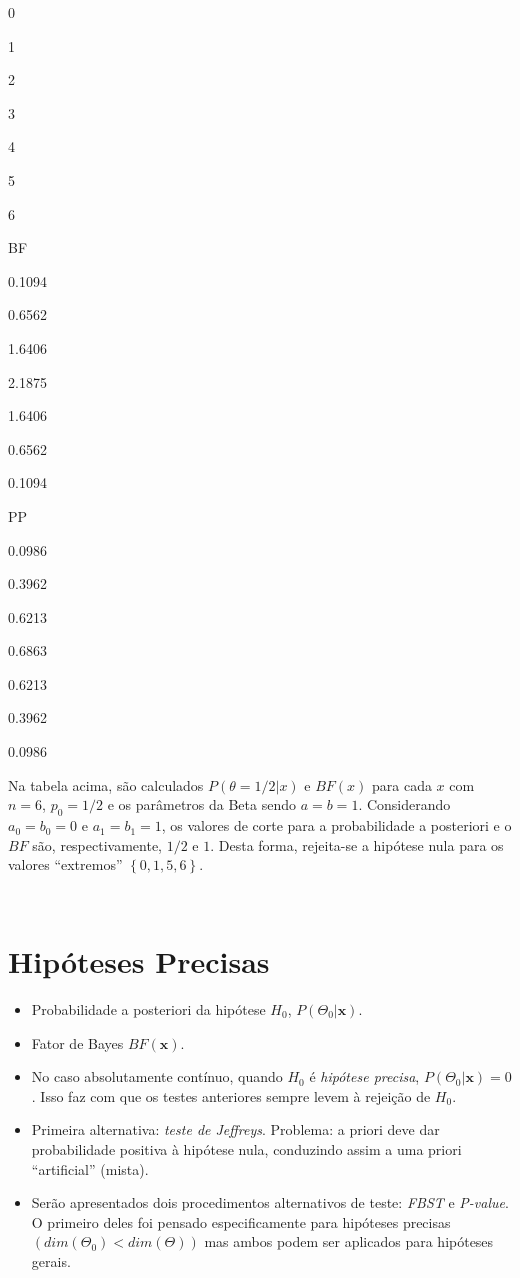 \documentclass[
]{book}
\begin{document}
0

1

2

3

4

5

6

BF

0.1094

0.6562

1.6406

2.1875

1.6406

0.6562

0.1094

PP

0.0986

0.3962

0.6213

0.6863

0.6213

0.3962

0.0986

Na tabela acima, são calculados \(P(\theta=1/2|x)\) e \(BF(x)\) para cada \(x\) com \(n=6\), \(p_0=1/2\) e os parâmetros da Beta sendo \(a=b=1\). Considerando \(a_0=b_0=0\) e \(a_1=b_1=1\), os valores de corte para a probabilidade a posteriori e o \(BF\) são, respectivamente, \(1/2\) e \(1\). Desta forma, rejeita-se a hipótese nula para os valores ``extremos'' \(\left\{0,1,5,6\right\}\).

\(~\)

\(~\)

\hypertarget{hipuxf3teses-precisas}{%
\section{Hipóteses Precisas}\label{hipuxf3teses-precisas}}

\begin{itemize}
\item
  Probabilidade a posteriori da hipótese \(H_0\), \(P(\Theta_0|\boldsymbol x)\).
\item
  Fator de Bayes \(BF(\boldsymbol x)\).
\item
  No caso absolutamente contínuo, quando \(H_0\) é \emph{hipótese precisa}, \(P(\Theta_0|\boldsymbol x)=0\). Isso faz com que os testes anteriores sempre levem à rejeição de \(H_0\).
\item
  Primeira alternativa: \emph{teste de Jeffreys}. Problema: a priori deve dar probabilidade positiva à hipótese nula, conduzindo assim a uma priori ``artificial'' (mista).
\item
  Serão apresentados dois procedimentos alternativos de teste: \emph{FBST} e \emph{P-value}. O primeiro deles foi pensado especificamente para hipóteses precisas \(\left(dim(\Theta_0)<dim(\Theta)\right)\) mas ambos podem ser aplicados para hipóteses gerais.
\end{itemize}
\end{document}
